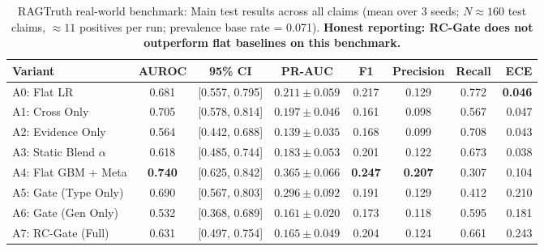 \documentclass[pdflatex,sn-mathphys,Numbered]{sn-jnl}
\begin{document}
\begin{table}[htbp]
\caption{RAGTruth real-world benchmark: Main test results across all claims (mean over 3 seeds; $N \approx 160$ test claims, $\approx 11$ positives per run; prevalence base rate = 0.071). \textbf{Honest reporting: RC-Gate does not outperform flat baselines on this benchmark.}}\label{tab:rag_main}
\footnotesize
\setlength{\tabcolsep}{3.0pt}
\begin{tabular}{@{}lccccccr@{}}
\toprule
\textbf{Variant} & \textbf{AUROC} & \textbf{95\% CI} & \textbf{PR-AUC} & \textbf{F1} & \textbf{Precision} & \textbf{Recall} & \textbf{ECE} \\
\midrule
A0: Flat LR & 0.681 & [0.557, 0.795] & $0.211\pm0.059$ & 0.217 & 0.129 & 0.772 & \textbf{0.046} \\
A1: Cross Only & 0.705 & [0.578, 0.814] & $0.197\pm0.046$ & 0.161 & 0.098 & 0.567 & 0.047 \\
A2: Evidence Only & 0.564 & [0.442, 0.688] & $0.139\pm0.035$ & 0.168 & 0.099 & 0.708 & 0.043 \\
A3: Static Blend $\alpha$ & 0.618 & [0.485, 0.744] & $0.183\pm0.053$ & 0.201 & 0.122 & 0.673 & 0.038 \\
A4: Flat GBM + Meta & \textbf{0.740} & [0.625, 0.842] & $\mathbf{0.365\pm0.066}$ & \textbf{0.247} & \textbf{0.207} & 0.307 & 0.104 \\
A5: Gate (Type Only) & 0.690 & [0.567, 0.803] & $0.296\pm0.092$ & 0.191 & 0.129 & 0.412 & 0.210 \\
A6: Gate (Gen Only) & 0.532 & [0.368, 0.689] & $0.161\pm0.020$ & 0.173 & 0.118 & 0.595 & 0.181 \\
A7: RC-Gate (Full) & 0.631 & [0.497, 0.754] & $0.165\pm0.049$ & 0.204 & 0.124 & 0.661 & 0.243 \\
\bottomrule
\end{tabular}
\end{table}
\end{document}
